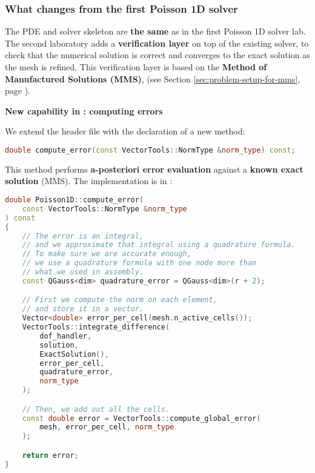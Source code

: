 \subsubsection{What changes from the first Poisson 1D solver}

The PDE and solver skeleton are \textbf{the same} as in the first Poisson 1D solver lab. The second laboratory adds a \textbf{verification layer} on top of the existing solver, to check that the numerical solution is correct and converges to the exact solution as the mesh is refined. This verification layer is based on the \textbf{Method of Manufactured Solutions (MMS)}, (see Section \ref{sec:problem-setup-for-mms}, page \pageref{sec:problem-setup-for-mms}).

\begin{flushleft}
    \textcolor{Green3}{ \textbf{New capability in : computing errors}}
\end{flushleft}
We extend the header file  with the declaration of a new method:
\begin{lstlisting}[language=C++]
double compute_error(const VectorTools::NormType &norm_type) const;\end{lstlisting}
This method performs \textbf{a-posteriori error evaluation} against a \textbf{known exact solution} (MMS). The implementation is in :
\begin{lstlisting}[language=C++]
double Poisson1D::compute_error(
    const VectorTools::NormType &norm_type
) const
{
    // The error is an integral,
    // and we approximate that integral using a quadrature formula.
    // To make sure we are accurate enough,
    // we use a quadrature formula with one node more than
    // what we used in assembly.
    const QGauss<dim> quadrature_error = QGauss<dim>(r + 2);

    // First we compute the norm on each element,
    // and store it in a vector.
    Vector<double> error_per_cell(mesh.n_active_cells());
    VectorTools::integrate_difference(
        dof_handler,
        solution,
        ExactSolution(),
        error_per_cell,
        quadrature_error,
        norm_type
    );

    // Then, we add out all the cells.
    const double error = VectorTools::compute_global_error(
        mesh, error_per_cell, norm_type
    );

    return error;
}\end{lstlisting}
